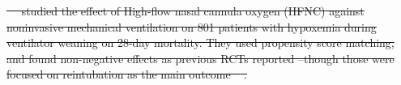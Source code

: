 \documentclass[10pt,letterpaper]{article}
\providecommand{\DIFdeltex}[1]{{\protect\color{red}\sout{#1}}}                      %
\providecommand{\DIFdelbegin}{} %
\providecommand{\DIFdelend}{} %
\providecommand{\DIFdel}[1]{\texorpdfstring{\DIFdeltex{#1}}{}} %
\newcommand{\DIFscaledelfig}{0.5}
\newlength{\DIFdelgraphicswidth} %
\newlength{\DIFdelgraphicsheight} %
\newcommand{\DIFdelincludegraphics}[2][]{%
\sbox{\DIFdelgraphicsbox}{\DIFOincludegraphics[#1]{#2}}%
\settoboxwidth{\DIFdelgraphicswidth}{\DIFdelgraphicsbox} %
\settoboxtotalheight{\DIFdelgraphicsheight}{\DIFdelgraphicsbox} %
\scalebox{\DIFscaledelfig}{%
\parbox[b]{\DIFdelgraphicswidth}{\usebox{\DIFdelgraphicsbox}\\[-\baselineskip] \rule{\DIFdelgraphicswidth}{0em}}\llap{\resizebox{\DIFdelgraphicswidth}{\DIFdelgraphicsheight}{%
\setlength{\unitlength}{\DIFdelgraphicswidth}%
\begin{picture}(1,1)%
\thicklines\linethickness{2pt} %
{\color[rgb]{1,0,0}\put(0,0){\framebox(1,1){}}}%
{\color[rgb]{1,0,0}\put(0,0){\line( 1,1){1}}}%
{\color[rgb]{1,0,0}\put(0,1){\line(1,-1){1}}}%
\end{picture}%
}\hspace*{3pt}}} %
} %
\DeclareRobustCommand{\DIFdelbegin}{\DIFOdelbegin \let\includegraphics\DIFdelincludegraphics} %
\DeclareRobustCommand{\DIFdelend}{\DIFOaddend \let\includegraphics\DIFOincludegraphics} %
\begin{document}
\DIFdelbegin %
\DIFdel{\mbox{%
\cite{liu2021effects} }\hskip0pt%
studied the effect of \textcolor{I}{High-flow
          nasal cannula oxygen (HFNC)} against \textcolor{C}{noninvasive
          mechanical ventilation} on \textcolor{P}{801 patients with hypoxemia
          during ventilator weaning} on \textcolor{O}{28-day mortality}. They
        used propensity score matching, and found non-negative effects as
        previous RCTs reported --though those were focused on reintubation as the
        main outcome \mbox{%
\cite{stephan2015high,hernandez2016effect}}\hskip0pt%
.
}\DIFdelend %
\end{document}
